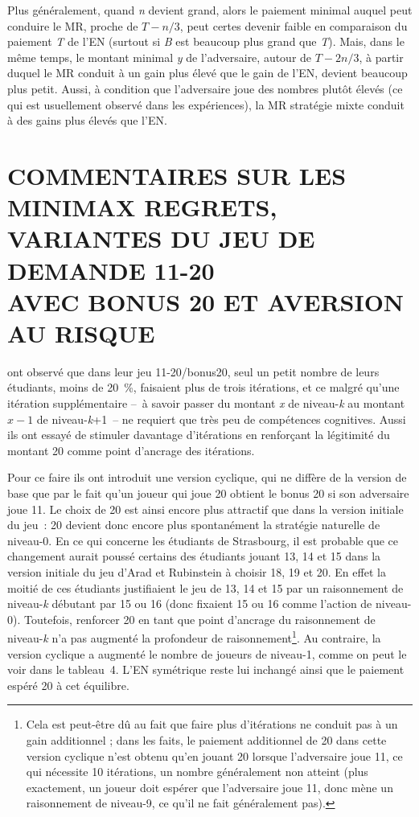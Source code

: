 \begin{Article}
\begin{refsection}[UmbhauerFR]
Plus généralement, quand \emph{n} devient grand, alors le paiement
minimal auquel peut conduire le MR, proche de \(T - n/3\), peut certes
devenir faible en comparaison du paiement \emph{T} de l'EN (surtout si
\emph{B} est beaucoup plus grand que \emph{T}). Mais, dans le même
temps, le montant minimal \emph{y} de l'adversaire, autour de
\(T - 2n/3\), à partir duquel le MR conduit à un gain plus élevé que le
gain de l'EN, devient beaucoup plus petit. Aussi, à condition que
l'adversaire joue des nombres plutôt élevés (ce qui est usuellement
observé dans les expériences), la MR stratégie mixte conduit à des gains
plus élevés que l'EN.

\section{COMMENTAIRES SUR LES MINIMAX REGRETS, \\ VARIANTES DU JEU DE DEMANDE 11-20 \\ AVEC BONUS 20 ET AVERSION AU RISQUE}
\label{section:Commentaires sur MR}

\textcite{arad2012} ont observé que dans leur jeu
11-20/bonus20, seul un petit nombre de leurs étudiants, moins de 20~\%,
faisaient plus de trois itérations, et ce malgré qu'une itération
supplémentaire --~à savoir passer du montant \emph{x} de niveau-\emph{k}
au montant $x-1$ de niveau-\emph{k}+1~-- ne requiert que très peu
de compétences cognitives. Aussi ils ont essayé de stimuler davantage
d'itérations en renforçant la légitimité du montant 20 comme point
d'ancrage des itérations.

Pour ce faire ils ont introduit une version cyclique, qui ne diffère de
la version de base que par le fait qu'un joueur qui joue 20 obtient le
bonus 20 si son adversaire joue 11. Le choix de 20 est ainsi encore plus
attractif que dans la version initiale du jeu~: 20 devient donc encore
plus spontanément la stratégie naturelle de niveau-0. En ce qui concerne
les étudiants de Strasbourg, il est probable que ce changement aurait
poussé certains des étudiants jouant 13, 14 et 15 dans la version
initiale du jeu d'Arad et Rubinstein à choisir 18, 19 et 20. En effet la
moitié de ces étudiants justifiaient le jeu de 13, 14 et 15 par un
raisonnement de niveau-\emph{k} débutant par 15 ou 16 (donc fixaient 15
ou 16 comme l'action de niveau-0). Toutefois, renforcer 20 en tant que
point d'ancrage du raisonnement de niveau-\emph{k} n'a pas augmenté la
profondeur de raisonnement\footnote{Cela est peut-être dû au fait que
  faire plus d'itérations ne conduit pas à un gain additionnel ; dans
  les faits, le paiement additionnel de 20 dans cette version cyclique
  n'est obtenu qu'en jouant 20 lorsque l'adversaire joue 11, ce qui
  nécessite 10 itérations, un nombre généralement non atteint (plus
  exactement, un joueur doit espérer que l'adversaire joue 11, donc mène
  un raisonnement de niveau-9, ce qu'il ne fait généralement pas).}. Au
contraire, la version cyclique a augmenté le nombre de joueurs de
niveau-1, comme on peut le voir dans le tableau~4. L'EN symétrique reste
lui inchangé ainsi que le paiement espéré 20 à cet équilibre.


\end{refsection}
\end{Article}
